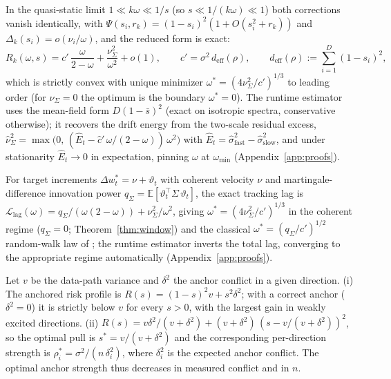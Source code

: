 \documentclass[twoside,11pt]{article}
\newcommand{\E}{\mathbb{E}}
\begin{document}
\begin{theorem}
In the quasi-static limit $1 \ll k\omega \ll 1/s$ (so $s \ll 1/(k\omega) \ll 1$) both corrections vanish identically, with $\Psi(s_i,r_k) = (1-s_i)^2(1+O(s_i^2+r_k))$ and $\Delta_k(s_i) = o(\nu_i/\omega)$, and the reduced form is exact:
\[
  R_k(\omega,s) = c'\,\frac{\omega}{2-\omega} + \frac{\nu^2_\Sigma}{\omega^2} + o(1),
  \qquad c' = \sigma^2\,d_{\mathrm{eff}}(\rho),
  \qquad d_{\mathrm{eff}}(\rho) := \sum_{i=1}^D (1-s_i)^2,
\]
which is strictly convex with unique minimizer $\omega^* = (4\nu^2_\Sigma/c')^{1/3}$ to leading order (for $\nu_\Sigma=0$ the optimum is the boundary $\omega^*=0$).
The runtime estimator uses the mean-field form $D(1-\bar s)^2$ (exact on isotropic spectra, conservative otherwise); it recovers the drift energy from the two-scale residual excess, $\widehat\nu^2_\Sigma = \max\bigl(0,\,(\widehat E_t - \hat c'\,\omega/(2-\omega))\,\omega^2\bigr)$ with $\widehat E_t = \widehat\sigma^2_{\mathrm{fast}} - \widehat\sigma^2_{\mathrm{slow}}$, and under stationarity $\widehat E_t \to 0$ in expectation, pinning $\omega$ at $\omega_{\min}$ (Appendix~\ref{app:proofs}).
\end{theorem}

\begin{corollary}
\label{cor:mixed}
For target increments $\Delta w^*_t = \nu + \vartheta_t$ with coherent velocity $\nu$ and martingale-difference innovation power $q_\Sigma = \E[\vartheta_t^\top \Sigma\, \vartheta_t]$, the exact tracking lag is $\mathcal{L}_{\mathrm{lag}}(\omega) = q_\Sigma/(\omega(2{-}\omega)) + \nu^2_\Sigma/\omega^2$, giving $\omega^* = (4\nu^2_\Sigma/c')^{1/3}$ in the coherent regime ($q_\Sigma = 0$; Theorem~\ref{thm:window}) and the classical $\omega^* = (q_\Sigma/c')^{1/2}$ random-walk law of \citet{widrow1976}; the runtime estimator inverts the total lag, converging to the appropriate regime automatically (Appendix~\ref{app:proofs}).
\end{corollary}

\begin{proposition}
\label{prop:conflict}
Let $v$ be the data-path variance and $\delta^2$ the anchor conflict in a given direction.
(i) The anchored risk profile is $R(s) = (1-s)^2 v + s^2 \delta^2$; with a correct anchor ($\delta^2 = 0$) it is strictly below $v$ for every $s > 0$, with the largest gain in weakly excited directions.
(ii) $R(s) = v\delta^2/(v+\delta^2) + (v+\delta^2)\,(s - v/(v+\delta^2))^2$, so the optimal pull is $s^* = v/(v+\delta^2)$ and the corresponding per-direction strength is $\rho^*_i = \sigma^2/(n\,\delta^2_i)$, where $\delta^2_i$ is the expected anchor conflict.
The optimal anchor strength thus decreases in measured conflict and in $n$.
\end{proposition}
\end{document}
